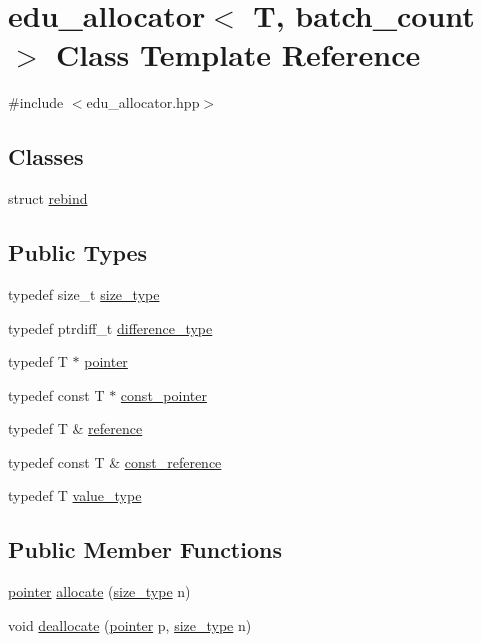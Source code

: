 \hypertarget{classedu__allocator}{}\section{edu\+\_\+allocator$<$ T, batch\+\_\+count $>$ Class Template Reference}
\label{classedu__allocator}


{\ttfamily \#include $<$edu\+\_\+allocator.\+hpp$>$}

\subsection*{Classes}
\begin{DoxyCompactItemize}
\item 
struct \hyperlink{structedu__allocator_1_1rebind}{rebind}
\end{DoxyCompactItemize}
\subsection*{Public Types}
\begin{DoxyCompactItemize}
\item 
typedef size\+\_\+t \hyperlink{classedu__allocator_a0f1fd4593fe3a8dcaf9381821f88a8e4}{size\+\_\+type}
\item 
typedef ptrdiff\+\_\+t \hyperlink{classedu__allocator_adb851ac1c1993a9fe70fef1942775426}{difference\+\_\+type}
\item 
typedef T $\ast$ \hyperlink{classedu__allocator_a9dc4e322674eb71d33056e8ab3c69e8f}{pointer}
\item 
typedef const T $\ast$ \hyperlink{classedu__allocator_afc0a1fdcec60f3297dab399d8988267b}{const\+\_\+pointer}
\item 
typedef T \& \hyperlink{classedu__allocator_a9bf7a7dfc44606f5fc1862518bc55a8d}{reference}
\item 
typedef const T \& \hyperlink{classedu__allocator_a8ce4e19bea2bf7de59ffa26a87ea814a}{const\+\_\+reference}
\item 
typedef T \hyperlink{classedu__allocator_aa6e217af32ed52f939e61187da75f6f4}{value\+\_\+type}
\end{DoxyCompactItemize}
\subsection*{Public Member Functions}
\begin{DoxyCompactItemize}
\item 
\hyperlink{classedu__allocator_a9dc4e322674eb71d33056e8ab3c69e8f}{pointer} \hyperlink{classedu__allocator_ab9fef5bee217179075d0e61f4d55ad29}{allocate} (\hyperlink{classedu__allocator_a0f1fd4593fe3a8dcaf9381821f88a8e4}{size\+\_\+type} n)
\item 
void \hyperlink{classedu__allocator_a0b5450f0bd0a44f1a195e25e45352778}{deallocate} (\hyperlink{classedu__allocator_a9dc4e322674eb71d33056e8ab3c69e8f}{pointer} p, \hyperlink{classedu__allocator_a0f1fd4593fe3a8dcaf9381821f88a8e4}{size\+\_\+type} n)
\end{DoxyCompactItemize}



